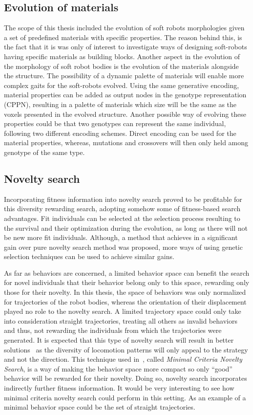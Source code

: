 \subsection*{Evolution of materials}
The scope of this thesis included the evolution of soft robots morphologies given a set of predefined materials with specific properties. The reason behind this, is the fact that it is was only of interest to investigate ways of designing soft-robots having specific materials as building blocks. Another aspect in the evolution of the morphology of soft robot bodies is the evolution of the materials alongside the structure. The possibility of a dynamic palette of materials will enable more complex gaits for the soft-robots evolved. Using the same generative encoding, material properties can be added as output nodes in the genotype representation (CPPN), resulting in a palette of materials which size will be the same as the voxels presented in the evolved structure. Another possible way of evolving these properties could be that two genotypes can represent the same individual, following two different encoding schemes. Direct encoding can be used for the material properties, whereas, mutations and crossovers will then only held among genotype of the same type.

\subsection*{Novelty search}
Incorporating fitness information into novelty search proved to be profitable for this diversity rewarding search, adopting somehow some of fitness-based search advantages. Fit individuals can be selected at the selection process resulting to the survival and their optimization during the evolution, as long as there will not be new more fit individuals. Although, a method  that achieves in a significant gain over pure novelty search method was proposed, more ways of using genetic selection techniques can be used to achieve similar gains.

As far as behaviors are concerned, a limited behavior space can benefit the search for novel individuals that their behavior belong only to this space, rewarding only those for their novelty. In this thesis, the space of behaviors was only normalized for trajectories of the robot bodies, whereas the orientation of their displacement played no role to the novelty search. A limited trajectory space could only take into consideration straight trajectories, treating all others as invalid behaviors and thus, not rewarding the individuals from which the trajectories were generated. It is expected that this type of novelty search will result in better solutions~\citep{lehman2011abandoning} as the diversity of locomotion patterns will only appeal to the strategy and not the direction. This technique used in~\citep{lehman2011abandoning}, called \emph{Minimal Criteria Novelty Search}, is a way of making the behavior space more compact so only ``good'' behavior will be rewarded for their novelty. Doing so, novelty search incorporates indirectly further fitness information. It would be very interesting to see how minimal criteria novelty search could perform in this setting. As an example of a minimal behavior space could be the set of straight trajectories.

